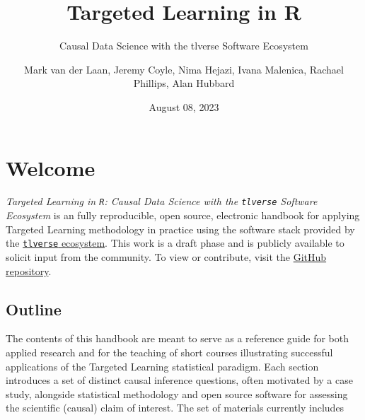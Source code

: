 \documentclass[
  12pt, krantz2,
]{krantz}
\title{Targeted Learning in R}
\subtitle{Causal Data Science with the tlverse Software Ecosystem}
\author{Mark van der Laan, Jeremy Coyle, Nima Hejazi, Ivana Malenica, Rachael Phillips, Alan Hubbard}
\date{August 08, 2023}
\newcommand{\passthrough}[1]{#1}
\newcommand{\1}{\mathbbm{1}}
\theoremstyle{definition}
\theoremstyle{definition}
\theoremstyle{definition}
\theoremstyle{definition}
\theoremstyle{remark}
\begin{document}
\maketitle


\thispagestyle{empty}

\begin{center}
\end{center}

\setlength{\abovedisplayskip}{-5pt}
\setlength{\abovedisplayshortskip}{-5pt}

\mainmatter

{
\hypersetup{linkcolor=}
\setcounter{tocdepth}{3}
\tableofcontents
}
\listoffigures
\hypertarget{welcome}{%
\chapter*{Welcome}\label{welcome}}


\emph{Targeted Learning in \passthrough{\lstinline!R!}: Causal Data Science with the \passthrough{\lstinline!tlverse!} Software
Ecosystem} is an fully reproducible, open source, electronic handbook for
applying Targeted Learning methodology in practice using the software stack
provided by the \href{https://github.com/tlverse}{\passthrough{\lstinline!tlverse!} ecosystem}. This work is
a draft phase and is publicly available to solicit input from the community. To
view or contribute, visit the \href{https://github.com/tlverse/tlverse-handbook}{GitHub
repository}.

\hypertarget{outline}{%
\section*{Outline}\label{outline}}


The contents of this handbook are meant to serve as a reference guide for both
applied research and for the teaching of short courses illustrating successful
applications of the Targeted Learning statistical paradigm. Each section
introduces a set of distinct causal inference questions, often motivated by a
case study, alongside statistical methodology and open source software for
assessing the scientific (causal) claim of interest. The set of materials
currently includes
\end{document}
